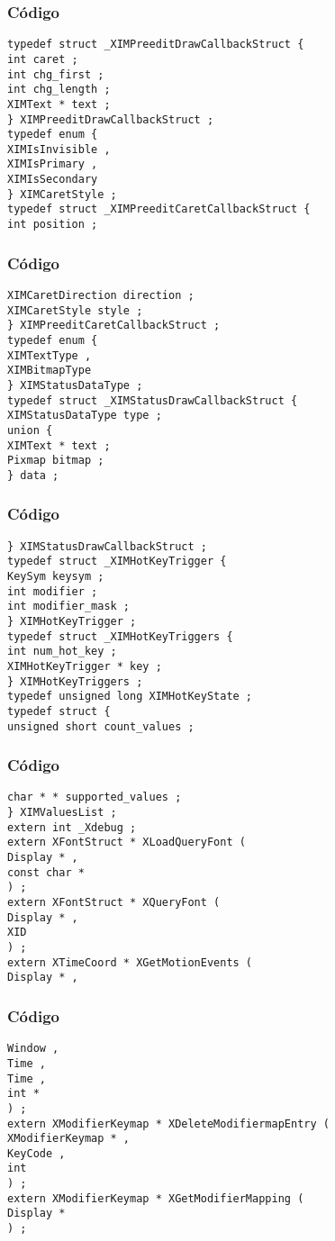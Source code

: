 \documentclass{beamer}
\begin{document}
\begin{frame}[fragile]
\frametitle{C\'odigo}
\begin{verbatim}
typedef struct _XIMPreeditDrawCallbackStruct { 
int caret ; 
int chg_first ; 
int chg_length ; 
XIMText * text ; 
} XIMPreeditDrawCallbackStruct ; 
typedef enum { 
XIMIsInvisible , 
XIMIsPrimary , 
XIMIsSecondary 
} XIMCaretStyle ; 
typedef struct _XIMPreeditCaretCallbackStruct { 
int position ; 
\end{verbatim}
\end{frame}
\begin{frame}[fragile]
\frametitle{C\'odigo}
\begin{verbatim}
XIMCaretDirection direction ; 
XIMCaretStyle style ; 
} XIMPreeditCaretCallbackStruct ; 
typedef enum { 
XIMTextType , 
XIMBitmapType 
} XIMStatusDataType ; 
typedef struct _XIMStatusDrawCallbackStruct { 
XIMStatusDataType type ; 
union { 
XIMText * text ; 
Pixmap bitmap ; 
} data ; 
\end{verbatim}
\end{frame}
\begin{frame}[fragile]
\frametitle{C\'odigo}
\begin{verbatim}
} XIMStatusDrawCallbackStruct ; 
typedef struct _XIMHotKeyTrigger { 
KeySym keysym ; 
int modifier ; 
int modifier_mask ; 
} XIMHotKeyTrigger ; 
typedef struct _XIMHotKeyTriggers { 
int num_hot_key ; 
XIMHotKeyTrigger * key ; 
} XIMHotKeyTriggers ; 
typedef unsigned long XIMHotKeyState ; 
typedef struct { 
unsigned short count_values ; 
\end{verbatim}
\end{frame}
\begin{frame}[fragile]
\frametitle{C\'odigo}
\begin{verbatim}
char * * supported_values ; 
} XIMValuesList ; 
extern int _Xdebug ; 
extern XFontStruct * XLoadQueryFont ( 
Display * , 
const char * 
) ; 
extern XFontStruct * XQueryFont ( 
Display * , 
XID 
) ; 
extern XTimeCoord * XGetMotionEvents ( 
Display * , 
\end{verbatim}
\end{frame}
\begin{frame}[fragile]
\frametitle{C\'odigo}
\begin{verbatim}
Window , 
Time , 
Time , 
int * 
) ; 
extern XModifierKeymap * XDeleteModifiermapEntry ( 
XModifierKeymap * , 
KeyCode , 
int 
) ; 
extern XModifierKeymap * XGetModifierMapping ( 
Display * 
) ; 
\end{verbatim}
\end{frame}
\end{document}

